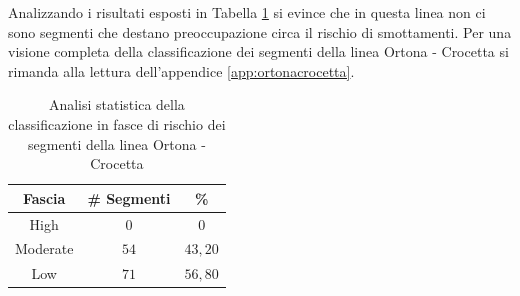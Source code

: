 \newline
Analizzando i risultati esposti in Tabella \ref{percentualeortonacrocetta} si evince che in questa linea non ci sono segmenti che destano preoccupazione circa il rischio di smottamenti. 
Per una visione completa della classificazione dei segmenti della linea Ortona - Crocetta si rimanda alla lettura dell'appendice \ref{app:ortonacrocetta}.
\begin{table}[h]
\centering
\begin{tabular}{|c|c|c|}
\hline \rowcolor{lightgray}
Fascia   & \# Segmenti & \%    \\ \hline \rowcolor{flamingopink}
High     & $0$           & $0$     \\ \hline \rowcolor{icterine}
Moderate & $54$          & $43,20$ \\ \hline \rowcolor{inchworm}
Low      & $71$          & $56,80$ \\ \hline
\end{tabular}
\caption{Analisi statistica della classificazione in fasce di rischio dei segmenti della linea Ortona - Crocetta}
\label{percentualeortonacrocetta}
\end{table}
\newpage
